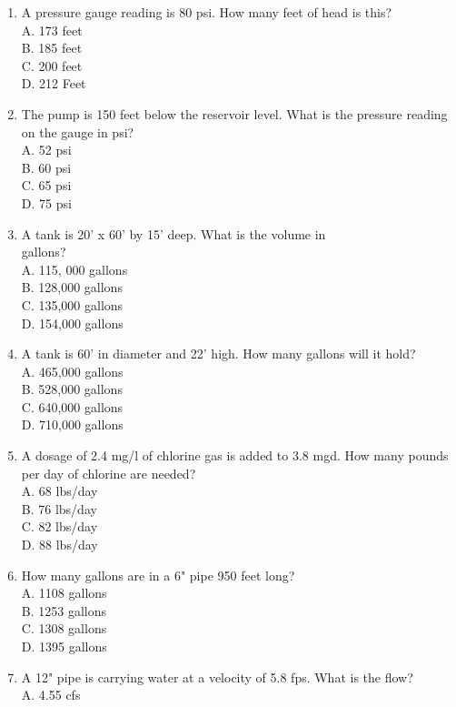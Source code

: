 \documentclass{article}
\begin{document}
\begin{enumerate}
\item A pressure gauge reading is 80 psi. How many feet of head is this?\\
A. 173 feet\\
B. 185 feet\\
C. 200 feet\\
D. 212 Feet\\
\item The pump is 150 feet below the reservoir level. What is the pressure reading on the gauge in psi?\\
A. 52 psi\\
B. 60 psi\\
C. 65 psi\\
D. 75 psi\\
\item A tank is 20' x 60' by 15' deep. What is the volume in\\
gallons?\\
A. 115, 000 gallons\\
B. 128,000 gallons\\
C. 135,000 gallons\\
D. 154,000 gallons\\
\item A tank is 60' in diameter and 22' high. How many gallons will it hold?\\
A. 465,000 gallons\\
B. 528,000 gallons\\
C. 640,000 gallons\\
D. 710,000 gallons\\
\item A dosage of 2.4 mg/l of chlorine gas is added to 3.8 mgd. How many pounds per day of chlorine are needed?\\
A. 68 lbs/day\\
B. 76 lbs/day\\
C. 82 lbs/day\\
D. 88 lbs/day\\
\item How many gallons are in a 6" pipe 950 feet long?\\
A. 1108 gallons\\
B. 1253 gallons\\
C. 1308 gallons\\
D. 1395 gallons\\
\item A 12" pipe is carrying water at a velocity of 5.8 fps. What is the flow?\\
A. 4.55 cfs\\

\end{enumerate}
\end{document}

